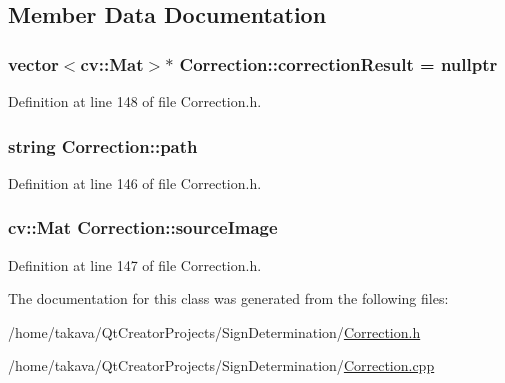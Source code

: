 \subsection{Member Data Documentation}
\hypertarget{class_correction_a02fff781df4df45a3bb6f0a2484cafcc}{
\subsubsection[{correction\+Result}]{\setlength{\rightskip}{0pt plus 5cm}vector$<$cv\+::\+Mat$>$$\ast$ Correction\+::correction\+Result = nullptr\hspace{0.3cm}{\ttfamily [private]}}}\label{class_correction_a02fff781df4df45a3bb6f0a2484cafcc}


Definition at line 148 of file Correction.\+h.

\hypertarget{class_correction_a6e1ccea5c33ea89d717d9227d17f625c}{
\subsubsection[{path}]{\setlength{\rightskip}{0pt plus 5cm}string Correction\+::path\hspace{0.3cm}{\ttfamily [private]}}}\label{class_correction_a6e1ccea5c33ea89d717d9227d17f625c}


Definition at line 146 of file Correction.\+h.

\hypertarget{class_correction_a1344ad4fb7d6a6346c2524e06feddd4b}{
\subsubsection[{source\+Image}]{\setlength{\rightskip}{0pt plus 5cm}cv\+::\+Mat Correction\+::source\+Image\hspace{0.3cm}{\ttfamily [private]}}}\label{class_correction_a1344ad4fb7d6a6346c2524e06feddd4b}


Definition at line 147 of file Correction.\+h.



The documentation for this class was generated from the following files\+:\begin{DoxyCompactItemize}
\item 
/home/takava/\+Qt\+Creator\+Projects/\+Sign\+Determination/\hyperlink{_correction_8h}{Correction.\+h}\item 
/home/takava/\+Qt\+Creator\+Projects/\+Sign\+Determination/\hyperlink{_correction_8cpp}{Correction.\+cpp}\end{DoxyCompactItemize}
